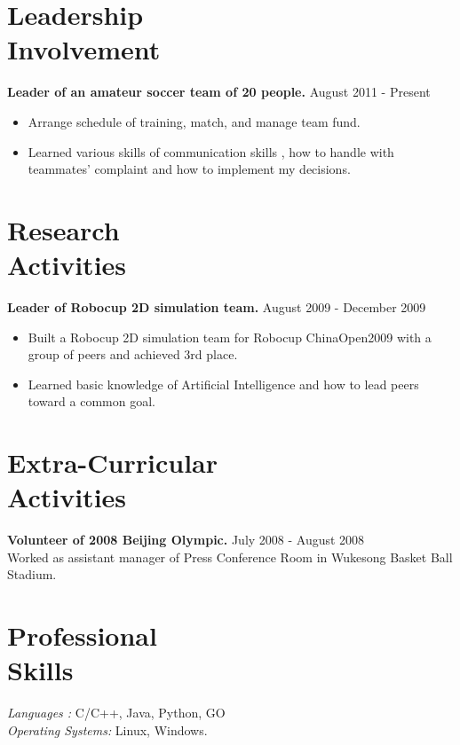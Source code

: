 \documentclass[margin]{res}
\begin{document}
\begin{resume}
 \section{Leadership \\ Involvement} 
				{ \bf Leader of an amateur soccer team of 20 people.} \hfill August 2011 - Present \\           
                 \begin{itemize}  \itemsep -2pt %
                 \item Arrange schedule of training, match, and manage team fund. 
                \item  Learned various skills of communication skills , how to handle with teammates' complaint and how to implement my decisions.
                \end{itemize}

\section{Research \\ Activities} 
				{ \bf Leader of Robocup 2D simulation team.} \hfill August 2009 - December 2009 \\  								
                 \begin{itemize}  \itemsep -2pt %
                 \item Built a Robocup 2D simulation team for Robocup ChinaOpen2009 with a group of peers and achieved 3rd place. 
                \item  Learned basic knowledge of Artificial Intelligence and how to lead peers toward a common goal.
                \end{itemize}

\section{Extra-Curricular \\ Activities} 
				{ \bf Volunteer of 2008 Beijing Olympic.} \hfill July 2008 - August 2008 \\  		
                 Worked as assistant manager of Press Conference Room in Wukesong Basket Ball Stadium.
 
 \section{Professional \\ Skills} {\sl Languages :} C/C++, Java, Python, GO\\
                {\sl Operating Systems:} Linux, Windows.
 

\end{resume}
\end{document}
